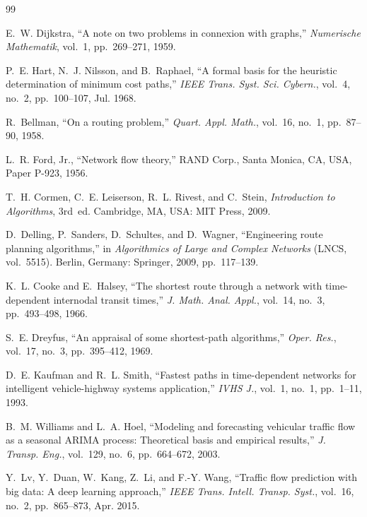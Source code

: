 \documentclass[conference]{IEEEtran}
\begin{document}
\begin{thebibliography}{99}

E.~W. Dijkstra, ``A note on two problems in connexion with graphs,''
\emph{Numerische Mathematik}, vol.~1, pp.~269--271, 1959.

P.~E. Hart, N.~J. Nilsson, and B.~Raphael, ``A formal basis for the
heuristic determination of minimum cost paths,'' \emph{IEEE Trans. Syst.
Sci. Cybern.}, vol.~4, no.~2, pp.~100--107, Jul. 1968.

R.~Bellman, ``On a routing problem,'' \emph{Quart. Appl. Math.},
vol.~16, no.~1, pp.~87--90, 1958.

L.~R. Ford, Jr., ``Network flow theory,'' RAND Corp., Santa Monica, CA,
USA, Paper P-923, 1956.

T.~H. Cormen, C.~E. Leiserson, R.~L. Rivest, and C.~Stein,
\emph{Introduction to Algorithms}, 3rd~ed. Cambridge, MA, USA: MIT Press,
2009.

D.~Delling, P.~Sanders, D.~Schultes, and D.~Wagner, ``Engineering route
planning algorithms,'' in \emph{Algorithmics of Large and Complex
Networks} (LNCS, vol.~5515). Berlin, Germany: Springer, 2009,
pp.~117--139.

K.~L. Cooke and E.~Halsey, ``The shortest route through a network with
time-dependent internodal transit times,'' \emph{J. Math. Anal. Appl.},
vol.~14, no.~3, pp.~493--498, 1966.

S.~E. Dreyfus, ``An appraisal of some shortest-path algorithms,''
\emph{Oper. Res.}, vol.~17, no.~3, pp.~395--412, 1969.

D.~E. Kaufman and R.~L. Smith, ``Fastest paths in time-dependent networks
for intelligent vehicle-highway systems application,'' \emph{IVHS J.},
vol.~1, no.~1, pp.~1--11, 1993.

B.~M. Williams and L.~A. Hoel, ``Modeling and forecasting vehicular
traffic flow as a seasonal ARIMA process: Theoretical basis and
empirical results,'' \emph{J. Transp. Eng.}, vol.~129, no.~6,
pp.~664--672, 2003.

Y.~Lv, Y.~Duan, W.~Kang, Z.~Li, and F.-Y. Wang, ``Traffic flow prediction
with big data: A deep learning approach,'' \emph{IEEE Trans. Intell.
Transp. Syst.}, vol.~16, no.~2, pp.~865--873, Apr. 2015.


\end{thebibliography}
\end{document}
